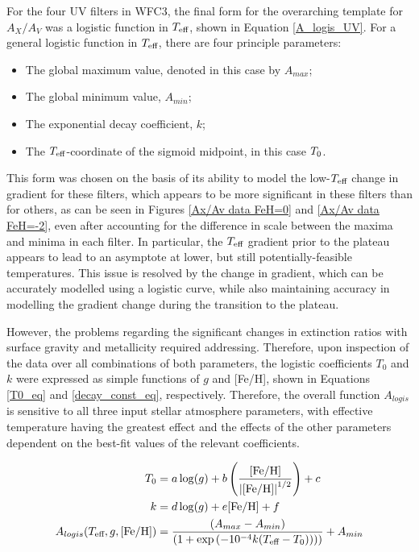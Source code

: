 \documentclass[12pt, a4paper]{report}
\begin{document}
For the four UV filters in WFC3, the final form for the overarching template for $A_{X}/A_{V}$ was a logistic function in $T_{\textnormal{eff}}$, shown in Equation \ref{A_logis_UV}. For a general logistic function in $T_{\textnormal{eff}}$, there are four principle parameters:
\begin{itemize}
\item The global maximum value, denoted in this case by $A_{max}$;
\item The global minimum value, $A_{min}$;
\item The exponential decay coefficient, $k$;
\item The $T_{\textnormal{eff}}$-coordinate of the sigmoid midpoint, in this case $T_{\textnormal{0}}$.
\end{itemize}

This form was chosen on the basis of its ability to model the low-$T_{\textnormal{eff}}$ change in gradient for these filters, which appears to be more significant in these filters than for others, as can be seen in Figures \ref{Ax/Av data FeH=0} and \ref{Ax/Av data FeH=-2}, even after accounting for the difference in scale between the maxima and minima in each filter. In particular, the $T_{\textnormal{eff}}$ gradient prior to the plateau appears to lead to an asymptote at lower, but still potentially-feasible temperatures. This issue is resolved by the change in gradient, which can be accurately modelled using a logistic curve, while also maintaining accuracy in modelling the gradient change during the transition to the plateau.

However, the problems regarding the significant changes in extinction ratios with surface gravity and metallicity required addressing. Therefore, upon inspection of the data over all combinations of both parameters, the logistic coefficients $T_{0}$ and $k$ were expressed as simple functions of $g$ and [Fe/H], shown in Equations \ref{T0_eq} and \ref{decay_const_eq}, respectively. Therefore, the overall function $A_{logis}$ is sensitive to all three input stellar atmosphere parameters, with effective temperature having the greatest effect and the effects of the other parameters dependent on the best-fit values of the relevant coefficients.

\begin{align}
T_{\textnormal{0}} &= a\log(g) + b\left(\frac{\textnormal{[Fe/H]}}{\left|\textnormal{[Fe/H]}\right|^{1/2}}\right) + c \label{T0_eq}\\
k &= d\log(g) + e\textnormal{[Fe/H]} + f \label{decay_const_eq}\\
A_{logis}(T_{\textnormal{eff}},g,\textnormal{[Fe/H]}) &= \frac{(A_{max}-A_{min})}{( 1 + \exp{(-10^{-4}k(T_{\textnormal{eff}}-T_{\textnormal{0}})) ) )}} + A_{min} \label{A_logis_UV}
\end{align}
\end{document}
